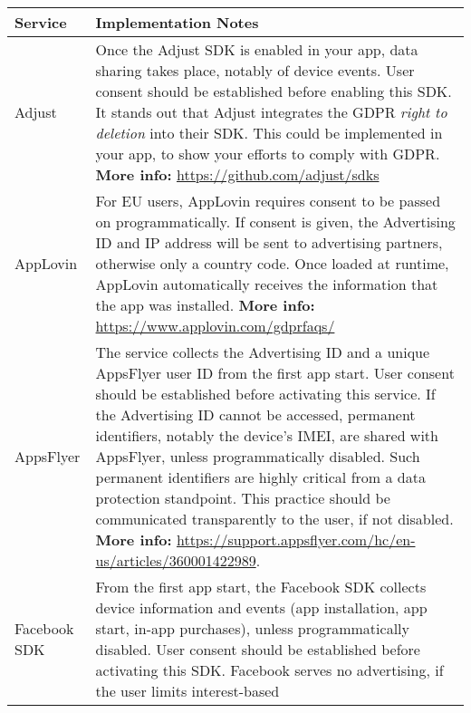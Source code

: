 \documentclass[
	12pt,
	a4paper,
	]{scrartcl}
\begin{document}
	\begin{footnotesize}
		\begin{longtable}{lp{}}
			\toprule
			Service & Implementation Notes \\ 
			\midrule 
			Adjust & Once the Adjust SDK is enabled in your app, data 
			sharing 
			takes place, notably of device events.
			User consent should be established before enabling this SDK.
			It stands out that Adjust integrates the GDPR \textit{right to 
			deletion} into their SDK. This could be implemented in your 
			app, 
			to show your efforts to comply with GDPR. \newline 
			\textbf{More 
			info:} \url{https://github.com/adjust/sdks} \\
			\midrule 
			AppLovin & For EU users, AppLovin requires consent to be 
			passed on 
			programmatically.
			If consent is given, the Advertising ID and IP address will be 
			sent to advertising partners, otherwise only a country code.
			Once loaded at runtime,
			AppLovin automatically receives the information that the app 
			was 
			installed. \newline \textbf{More info:} 
			\url{https://www.applovin.com/gdprfaqs/} \\
			\midrule 
			AppsFlyer & The service collects the Advertising ID and a 
			unique 
			AppsFlyer user ID from the first app start.
			User consent should be established before activating this 
			service.
			If the Advertising ID cannot be accessed, permanent 
			identifiers, 
			notably the device's IMEI, are shared with AppsFlyer, unless 
			programmatically disabled. Such permanent identifiers are 
			highly 
			critical from a data protection standpoint.
			This practice should be communicated transparently to the 
			user, if 
			not disabled. \newline
			\textbf{More info:} 
			\url{https://support.appsflyer.com/hc/en-us/articles/360001422989}.
			 \\
			\midrule 
			Facebook SDK & From the first app start, the Facebook SDK 
			collects 
			device information and events (app installation, app start, 
			in-app 
			purchases), unless programmatically disabled.
			User consent should be established before activating this SDK.
			Facebook serves no advertising, if the user limits 
			interest-based 

\end{longtable}
\end{footnotesize}
\end{document}
